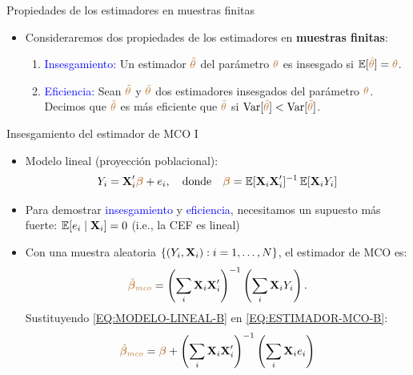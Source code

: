\documentclass[10pt, xcolor=dvipsnames]{beamer}
\begin{document}
\begin{frame}{Propiedades de los estimadores en muestras finitas}
\begin{itemize}
    \item Consideraremos dos propiedades de los estimadores en \textbf{muestras finitas}:
    \begin{enumerate}
        \item \textcolor{blue}{Insesgamiento:} Un estimador \(\textcolor{brown}{\hat{\theta}}\) del parámetro \(\textcolor{brown}{\theta}\) es insesgado si \(\operatorname{\mathbb{E}} [\textcolor{brown}{\hat{\theta}}] = \textcolor{brown}{\theta}\). 
        \vspace{0.2cm}        
        \item \textcolor{blue}{Eficiencia:} Sean \(\textcolor{brown}{\hat{\theta}}\) y \(\textcolor{brown}{\tilde{\theta}}\) dos estimadores insesgados del parámetro \(\textcolor{brown}{\theta}\). Decimos que \(\textcolor{brown}{\hat{\theta}}\) es más eficiente que \(\textcolor{brown}{\tilde{\theta}}\) si \( \operatorname{Var}[\textcolor{brown}{\hat{\theta}}] < \operatorname{Var}[\textcolor{brown}{\tilde{\theta}}]\).
    \end{enumerate}
\end{itemize}
\end{frame}


\begin{frame}{Insesgamiento del estimador de MCO I}
\begin{itemize}
    \item Modelo lineal (proyección poblacional):
    \begin{align}\label{EQ:MODELO-LINEAL-B}
        Y_i = \textbf{X}'_i \textcolor{brown}{\boldsymbol{\beta}} + e_i, \quad \text{donde} \quad  \textcolor{brown}{\boldsymbol{\beta}} = \operatorname{\mathbb{E}}[\textbf{X}_i\textbf{X}'_i]^{-1} \operatorname{\mathbb{E}}[\textbf{X}_iY_i]        
    \end{align}
    \item Para demostrar \textcolor{blue}{insesgamiento} y \textcolor{blue}{eficiencia}, necesitamos un supuesto más fuerte: \(\operatorname{\mathbb{E}}[e_i \mid \textbf{X}_i] = 0\) (i.e., la CEF es lineal) 
    \vspace{0.5em}
    \item Con una muestra aleatoria \(\{(Y_i, \textbf{X}_i): i=1,\ldots,N\}\), el estimador de MCO es:
    \vspace{-0.5em}
    \begin{align}\label{EQ:ESTIMADOR-MCO-B}
        \textcolor{brown}{\hat{\boldsymbol{\beta}}_{mco}} = \left(\sum_i \textbf{X}_i \textbf{X}'_i \right)^{-1} \left(\sum_i  \textbf{X}_i Y_i\right).
    \end{align}
    \vspace{-0.5em}
    Sustituyendo \eqref{EQ:MODELO-LINEAL-B} en \eqref{EQ:ESTIMADOR-MCO-B}:
    \begin{align*}
    \begin{split}
        \textcolor{brown}{\hat{\boldsymbol{\beta}}_{mco}} = \textcolor{brown}{\boldsymbol{\beta}} + \left(\sum_i \textbf{X}_i \textbf{X}'_i \right)^{-1} \left(\sum_i  \textbf{X}_i e_i\right)
    \end{split}
    \end{align*}
\end{itemize}
\end{frame}
\end{document}
